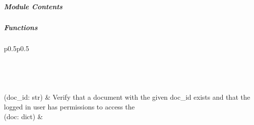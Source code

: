 \documentclass[letterpaper,10pt,english]{sphinxmanual}
\begin{document}
\subparagraph{Module Contents}
\label{\detokenize{autoapi/pine/backend/annotations/bp/index:module-contents}}

\subparagraph{Functions}
\label{\detokenize{autoapi/pine/backend/annotations/bp/index:functions}}

\begin{savenotes}\sphinxatlongtablestart\begin{longtable}[c]{p{0.5\linewidth}p{0.5\linewidth}}
\hline

\endfirsthead

%
{}\\
\hline

\endhead

\hline
{}\\
\endfoot

\endlastfoot

{\hyperref[\detokenize{autoapi/pine/backend/annotations/bp/index:pine.backend.annotations.bp.check_document_by_id}]{}}(doc\_id: str)
&
Verify that a document with the given doc\_id exists and that the logged in user has permissions to access the
\\
\hline
{\hyperref[\detokenize{autoapi/pine/backend/annotations/bp/index:pine.backend.annotations.bp.check_document}]{}}(doc: dict)
&


\end{longtable}
\end{savenotes}
\end{document}
